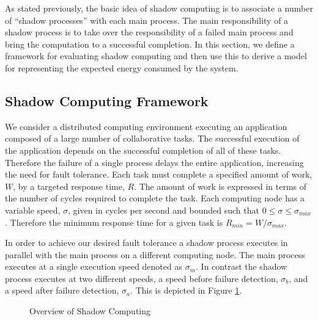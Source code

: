 As stated previously, the basic idea of shadow computing is to
associate a number of ``shadow processes'' with each main process. The
main responsibility of a shadow process is to take over the
responsibility of a failed main process and bring the computation to a
successful completion.  In this section, we define a framework for
evaluating shadow computing and then use this to derive a model for
representing the expected energy consumed by the system. %


\subsection{Shadow Computing Framework}
\label{shadow_computing_framework}

We consider a distributed computing environment executing an
application composed of a large number of collaborative tasks. The
successful execution of the application depends on the successful
completion of all of these tasks. Therefore the failure of a single
process delays the entire application, increasing the need for fault
tolerance. Each task must complete a specified amount of work, $W$, by
a targeted response time, $R$. The amount of work is expressed in
terms of the number of cycles required to complete the task. Each
computing node has a variable speed, $\sigma$, given in cycles per
second and bounded such that $0\leq\sigma\leq\sigma_{max}$. Therefore
the minimum response time for a given task is $R_{min}=W/\sigma_{max}$.

In order to achieve our desired fault tolerance a shadow process
executes in parallel with the main process on a different computing
node. The main process executes at a single execution speed denoted as
$\sigma_m$. In contrast the shadow process executes at two different
speeds, a speed before failure detection, $\sigma_b$, and a speed
after failure detection, $\sigma_a$. This is depicted in Figure
\ref{shadow_overview}.

\begin{figure}[hHtb]
\centering
{}
\caption { Overview of Shadow Computing }
\label{shadow_overview}
\end{figure}


